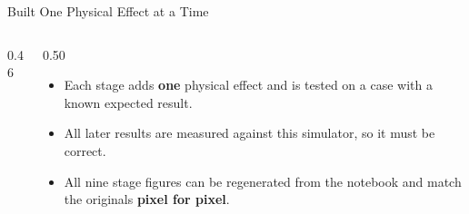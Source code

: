 \newcommand{\eqslide}[3]{%
\begin{frame}{#2}
  \vspace{0.05em}
  {\centering\termtracker{#1}\par}
  \vspace{0.35em}
  #3
\end{frame}}

\newcommand{\eqcards}[3]{%
  \begin{columns}[T,onlytextwidth]
    \begin{column}{0.325\textwidth}#1\end{column}
    \begin{column}{0.325\textwidth}#2\end{column}
    \begin{column}{0.325\textwidth}#3\end{column}
  \end{columns}}

\newcommand{\eqfoot}[1]{\par\vspace{0.3em}{\color{uniSlate}\scriptsize #1\par}}

\begin{frame}{Built One Physical Effect at a Time}
  \vspace{0.2em}
  \begin{columns}[c,onlytextwidth]
    \begin{column}{0.46\textwidth}
      \centering
    \end{column}
    \begin{column}{0.50\textwidth}
      \begin{itemize}\setlength\itemsep{0.6em}
        \item Each stage adds \textbf{one} physical effect and is tested on a
              case with a known expected result.
        \item All later results are \alert{measured against this simulator},
              so it must be correct.
        \item All nine stage figures can be regenerated from the notebook and
              match the originals \textbf{pixel for pixel}.
      \end{itemize}
    \end{column}
  \end{columns}
\end{frame}

